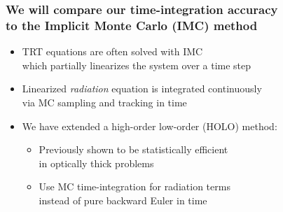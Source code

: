 \documentclass[xcolor=dvipsnames,hyperref={pdfpagelabels=false},unknownkeysallowed]{beamer}
\newcommand{\colb}[1]{{\color{blue} #1}}
\newcommand{\colG}[1]{{\color{Gray!110} #1}}
\newlength{\wideitemsep}
\let\olditem\item
\renewcommand{\item}{\setlength{\itemsep}{\wideitemsep}\olditem}
\begin{document}
\begin{frame}
    \frametitle{We will compare our time-integration accuracy \\ to the \textbf{Implicit Monte Carlo} (IMC) method}
{\addtolength{\leftmargini}{-0.3in}
   \begin{itemize}
        \item[] TRT equations are often solved with IMC \\
            \colG{which partially linearizes the system over a time step}
        \item[] Linearized \emph{radiation} equation is integrated \colb{continuously}
            \\ \colG{via MC sampling and tracking in time}
            \pause
        \item[] We have extended a \colb{high-order low-order (HOLO)} method:  \\ 
            \begin{itemize}
            \vspace{0.02in}
                 \item[] Previously shown to be statistically efficient \\ in optically thick problems
                 \item[] Use MC time-integration for radiation terms \\ \colG{instead of pure backward Euler in time}
           \end{itemize}
   \end{itemize}
   }
\end{frame}
\end{document}
